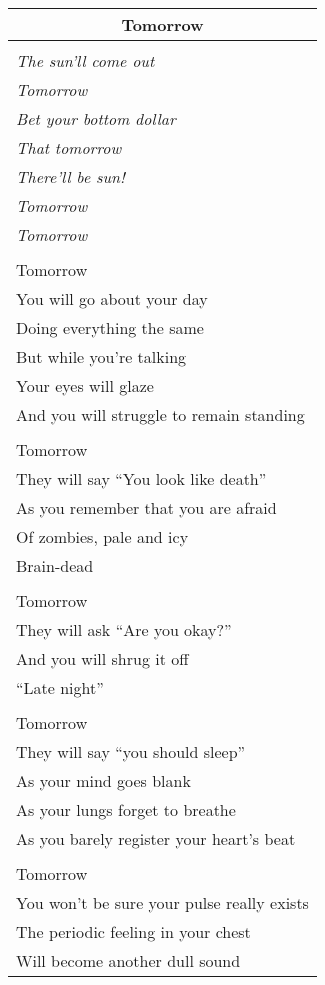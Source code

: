 \documentclass{article}
\begin{document}
\begin{center}
\begin{tabular}{l}
\multicolumn{1}{c}{\textbf{Tomorrow}} \\ \hline
\\
\textit{The sun'll come out} \\
\textit{Tomorrow} \\
\textit{Bet your bottom dollar} \\
\textit{That tomorrow} \\
\textit{There'll be sun!} \\
\hspace*{2ex}\textit{Tomorrow} \\
\hspace*{4ex}\textit{Tomorrow} \\
\\
Tomorrow \\
You will go about your day \\
Doing everything the same \\
But while you're talking \\
Your eyes will glaze \\
And you will struggle to remain standing \\
\\
Tomorrow \\
They will say ``You look like death'' \\
As you remember that you are afraid \\
Of zombies, pale and icy \\
Brain-dead \\
\\
Tomorrow \\
They will ask ``Are you okay?'' \\
And you will shrug it off \\
``Late night'' \\
\\
Tomorrow \\
They will say ``you should sleep'' \\
As your mind goes blank \\
As your lungs forget to breathe \\
As you barely register your heart's beat \\
\\
Tomorrow \\
You won't be sure your pulse really exists \\
The periodic feeling in your chest \\
Will become another dull sound \\

\end{tabular}
\end{center}
\end{document}
